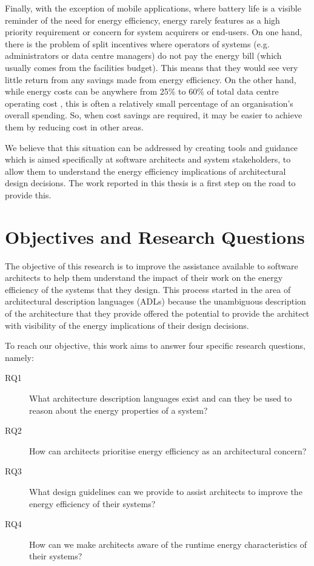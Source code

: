 Finally, with the exception of mobile applications, where battery life is a visible reminder of the need for energy efficiency, energy rarely features as a high priority requirement or concern for system acquirers or end-users. On one hand, there is the problem of split incentives where operators of systems (e.g. administrators or data centre managers) do not pay the energy bill (which usually comes from the facilities budget). This means that they would see very little return from any savings made from energy efficiency. On the other hand, while energy costs can be anywhere from 25\% to 60\% of total data centre operating cost \cite{techuk2013-dcpower}, this is often a relatively small percentage of an organisation's overall spending. So, when cost savings are required, it may be easier to achieve them by reducing cost in other areas.

We believe that this situation can be addressed by creating tools and guidance which is aimed specifically at software architects and system stakeholders, to allow them to understand the energy efficiency implications of architectural design decisions.  The work reported in this thesis is a first step on the road to provide this.

\section{Objectives and Research Questions}

The objective of this research is to improve the assistance available to software architects to help them understand the impact of their work on the energy efficiency of the systems that they design.  This process started in the area of architectural description languages (ADLs) because the unambiguous description of the architecture that they provide offered the potential to provide the architect with visibility of the energy implications of their design decisions.

To reach our objective, this work aims to answer four specific research questions, namely:
\nopagebreak
\begin{description}
\item [RQ1] What architecture description languages exist and can they be used to reason about the energy properties of a system?
\item [RQ2] How can architects prioritise energy efficiency as an architectural concern?
\item [RQ3] What design guidelines can we provide to assist architects to improve the energy efficiency of their systems?
\item [RQ4] How can we make architects aware of the runtime energy characteristics of their systems?
\end{description}

